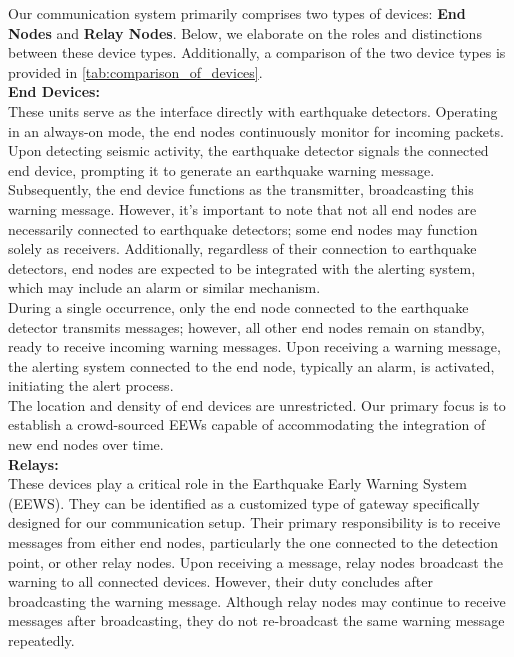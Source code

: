 Our communication system primarily comprises two types of devices: \textbf{End Nodes} and \textbf{Relay Nodes}. Below, we elaborate on the roles and distinctions between these device types. Additionally, a comparison of the two device types is provided in \autoref{tab:comparison_of_devices}.\\

\noindent\textbf{End Devices:}\\

These units serve as the interface directly with earthquake detectors. Operating in an always-on mode, the end nodes continuously monitor for incoming packets. Upon detecting seismic activity, the earthquake detector signals the connected end device, prompting it to generate an earthquake warning message. Subsequently, the end device functions as the transmitter, broadcasting this warning message. However, it's important to note that not all end nodes are necessarily connected to earthquake detectors; some end nodes may function solely as receivers. Additionally, regardless of their connection to earthquake detectors, end nodes are expected to be integrated with the alerting system, which may include an alarm or similar mechanism.\\

During a single occurrence, only the end node connected to the earthquake detector transmits messages; however, all other end nodes remain on standby, ready to receive incoming warning messages. Upon receiving a warning message, the alerting system connected to the end node, typically an alarm, is activated, initiating the alert process.\\

The location and density of end devices are unrestricted. Our primary focus is to establish a crowd-sourced \ac{EEWs} capable of accommodating the integration of new end nodes over time.\\

\noindent\textbf{Relays:}\\

These devices play a critical role in the Earthquake Early Warning System (EEWS). They can be identified as a customized type of gateway specifically designed for our communication setup. Their primary responsibility is to receive messages from either end nodes, particularly the one connected to the detection point, or other relay nodes. Upon receiving a message, relay nodes broadcast the warning to all connected devices. However, their duty concludes after broadcasting the warning message. Although relay nodes may continue to receive messages after broadcasting, they do not re-broadcast the same warning message repeatedly.\\

